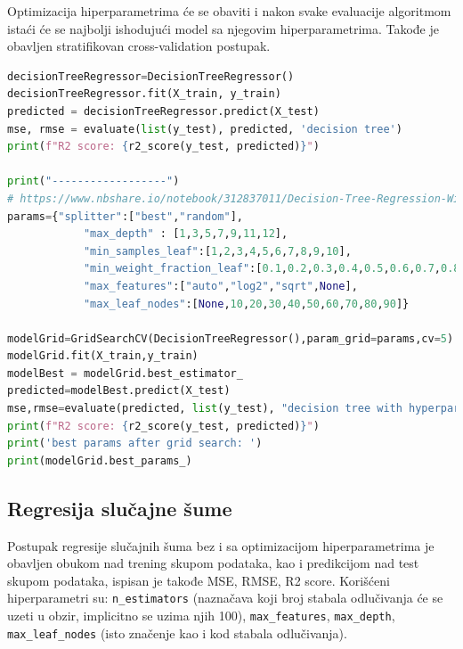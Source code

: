 \documentclass[fontsize=12bp, paper=a4]{scrarticle}
\begin{document}
Optimizacija hiperparametrima\cite{GridSearchCV} će se obaviti i nakon svake evaluacije algoritmom istaći će se najbolji ishodujući model sa njegovim hiperparametrima. Takođe je obavljen stratifikovan cross-validation postupak.

\begin{lstlisting}[language=Python, caption=\centering Postupak regresije stabla odlučivanja bez i sa optimizacijom hiperparametrima]
decisionTreeRegressor=DecisionTreeRegressor()
decisionTreeRegressor.fit(X_train, y_train)
predicted = decisionTreeRegressor.predict(X_test)
mse, rmse = evaluate(list(y_test), predicted, 'decision tree')
print(f"R2 score: {r2_score(y_test, predicted)}")

print("------------------")
# https://www.nbshare.io/notebook/312837011/Decision-Tree-Regression-With-Hyper-Parameter-Tuning-In-Python/
params={"splitter":["best","random"],
            "max_depth" : [1,3,5,7,9,11,12],
            "min_samples_leaf":[1,2,3,4,5,6,7,8,9,10],
            "min_weight_fraction_leaf":[0.1,0.2,0.3,0.4,0.5,0.6,0.7,0.8,0.9],
            "max_features":["auto","log2","sqrt",None],
            "max_leaf_nodes":[None,10,20,30,40,50,60,70,80,90]}

modelGrid=GridSearchCV(DecisionTreeRegressor(),param_grid=params,cv=5)
modelGrid.fit(X_train,y_train)
modelBest = modelGrid.best_estimator_
predicted=modelBest.predict(X_test)
mse,rmse=evaluate(predicted, list(y_test), "decision tree with hyperparameter optimization")
print(f"R2 score: {r2_score(y_test, predicted)}")
print('best params after grid search: ')
print(modelGrid.best_params_)

\end{lstlisting}

\subsection{Regresija slučajne šume}
Postupak regresije slučajnih šuma\cite{RFR} bez i sa optimizacijom hiperparametrima je obavljen obukom nad trening skupom podataka, kao i predikcijom nad test skupom podataka, ispisan je takođe MSE, RMSE, R2 score. Korišćeni hiperparametri su: \texttt{n\_estimators} (naznačava koji broj stabala odlučivanja će se uzeti u obzir, implicitno se uzima njih 100), \texttt{max\_features}, \texttt{max\_depth}, \texttt{max\_leaf\_nodes} (isto značenje kao i kod stabala odlučivanja).
\end{document}
